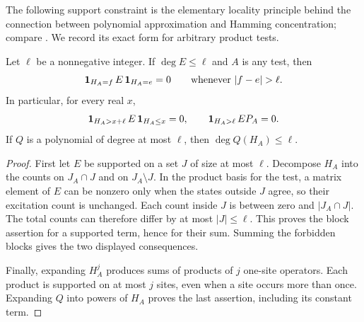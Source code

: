 The following support constraint is the elementary locality principle
behind the connection between polynomial approximation and Hamming
concentration; compare \citet[Lemmas~2.10--2.11]{AnshuMetger2023}.
We record its exact form for arbitrary product tests.

\begin{lemma}
\label{lem:degree-shift}
Let $\ell$ be a nonnegative integer.  If $\deg E\le\ell$ and $A$ is any
test, then
\[
 \one_{H_A=f}\,E\,\one_{H_A=e}=0
 \qquad\text{whenever }|f-e|>\ell.
\]
In particular, for every real $x$,
\[
 \mathbf 1_{H_A>x+\ell}\,E\,\mathbf 1_{H_A\le x}=0,
 \qquad
 \mathbf 1_{H_A>\ell}\,EP_A=0.
\]
If $Q$ is a polynomial of degree at most $\ell$, then
$\deg Q(H_A)\le\ell$.
\end{lemma}

\begin{proof}
First let $E$ be supported on a set $J$ of size at most $\ell$.
Decompose $H_A$ into the counts on $J_A\cap J$ and on $J_A\setminus J$.
In the product basis for the test, a matrix element of $E$ can be nonzero
only when the states outside $J$ agree, so their excitation count is
unchanged.  Each count inside $J$ is between zero and $|J_A\cap J|$.
The total counts can therefore differ by at most $|J|\le\ell$.  This
proves the block assertion for a supported term, hence for their sum.
Summing the forbidden blocks gives the two displayed consequences.

Finally, expanding $H_A^j$ produces sums of products of $j$ one-site
operators.  Each product is supported on at most $j$ sites, even when a
site occurs more than once.  Expanding $Q$ into powers of $H_A$ proves the
last assertion, including its constant term.
\end{proof}
